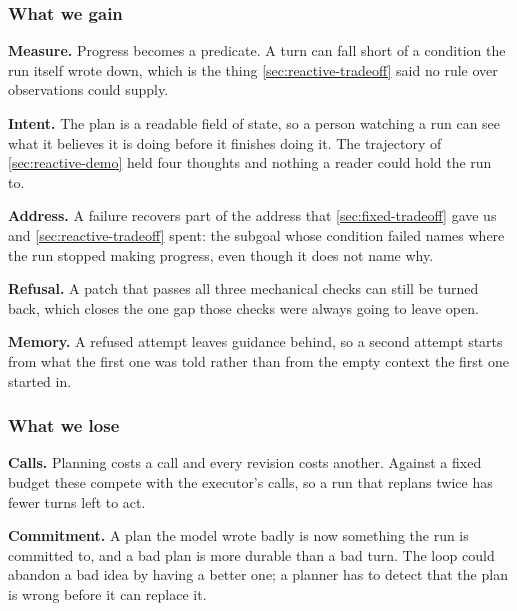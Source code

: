 \subsubsection{What we gain}

\bi

\item \textbf{Measure.} Progress becomes a predicate. A turn can fall short of a condition the run
itself wrote down, which is the thing \cref{sec:reactive-tradeoff} said no rule over observations
could supply.

\item \textbf{Intent.} The plan is a readable field of state, so a person watching a run can see
what it believes it is doing before it finishes doing it. The trajectory of \cref{sec:reactive-demo}
held four thoughts and nothing a reader could hold the run to.

\item \textbf{Address.} A failure recovers part of the address that \cref{sec:fixed-tradeoff} gave
us and \cref{sec:reactive-tradeoff} spent: the subgoal whose condition failed names where the run
stopped making progress, even though it does not name why.

\item \textbf{Refusal.} A patch that passes all three mechanical checks can still be turned back,
which closes the one gap those checks were always going to leave open.

\item \textbf{Memory.} A refused attempt leaves guidance behind, so a second attempt starts from
what the first one was told rather than from the empty context the first one started in.

\ei

\subsubsection{What we lose}

\bi

\item \textbf{Calls.} Planning costs a call and every revision costs another. Against a fixed budget
these compete with the executor's calls, so a run that replans twice has fewer turns left to act.

\item \textbf{Commitment.} A plan the model wrote badly is now something the run is committed to,
and a bad plan is more durable than a bad turn. The loop could abandon a bad idea by having a
better one; a planner has to detect that the plan is wrong before it can replace it.

